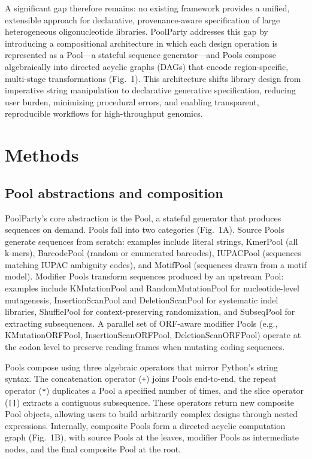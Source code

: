 \documentclass[unnumsec,webpdf,modern,large]{mam-authoring-template}%
\theoremstyle{thmstyleone}%
\theoremstyle{thmstyletwo}%
\theoremstyle{thmstylethree}%
\begin{document}
A significant gap therefore remains: no existing framework provides a unified, extensible approach for declarative, provenance-aware specification of large heterogeneous oligonucleotide libraries. PoolParty addresses this gap by introducing a compositional architecture in which each design operation is represented as a Pool---a stateful sequence generator---and Pools compose algebraically into directed acyclic graphs (DAGs) that encode region-specific, multi-stage transformations (Fig.~1). This architecture shifts library design from imperative string manipulation to declarative generative specification, reducing user burden, minimizing procedural errors, and enabling transparent, reproducible workflows for high-throughput genomics.

\section{Methods}

\subsection{Pool abstractions and composition}

PoolParty's core abstraction is the Pool, a stateful generator that produces sequences on demand. Pools fall into two categories (Fig.~1A). Source Pools generate sequences from scratch: examples include literal strings, KmerPool (all k-mers), BarcodePool (random or enumerated barcodes), IUPACPool (sequences matching IUPAC ambiguity codes), and MotifPool (sequences drawn from a motif model). Modifier Pools transform sequences produced by an upstream Pool: examples include KMutationPool and RandomMutationPool for nucleotide-level mutagenesis, InsertionScanPool and DeletionScanPool for systematic indel libraries, ShufflePool for context-preserving randomization, and SubseqPool for extracting subsequences. A parallel set of ORF-aware modifier Pools (e.g., KMutationORFPool, InsertionScanORFPool, DeletionScanORFPool) operate at the codon level to preserve reading frames when mutating coding sequences.

Pools compose using three algebraic operators that mirror Python's string syntax. The concatenation operator (\texttt{+}) joins Pools end-to-end, the repeat operator (\texttt{*}) duplicates a Pool a specified number of times, and the slice operator (\texttt{[]}) extracts a contiguous subsequence. These operators return new composite Pool objects, allowing users to build arbitrarily complex designs through nested expressions. Internally, composite Pools form a directed acyclic computation graph (Fig.~1B), with source Pools at the leaves, modifier Pools as intermediate nodes, and the final composite Pool at the root.
\end{document}
